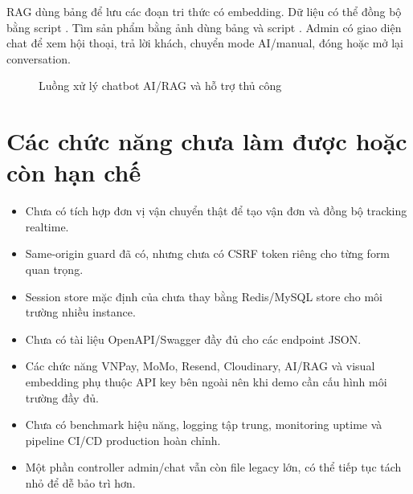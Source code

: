 \documentclass[12pt,a4paper]{report}
\begin{document}
RAG dùng bảng  để lưu các đoạn tri thức có embedding. Dữ liệu có thể đồng bộ bằng script . Tìm sản phẩm bằng ảnh dùng bảng  và script . Admin có giao diện chat để xem hội thoại, trả lời khách, chuyển mode AI/manual, đóng hoặc mở lại conversation.

\begin{figure}[H]
    \centering
    \caption{Luồng xử lý chatbot AI/RAG và hỗ trợ thủ công}
    \label{fig:chat-rag-flow}
\end{figure}

\section{Các chức năng chưa làm được hoặc còn hạn chế}

\begin{itemize}
    \item Chưa có tích hợp đơn vị vận chuyển thật để tạo vận đơn và đồng bộ tracking realtime.
    \item Same-origin guard đã có, nhưng chưa có CSRF token riêng cho từng form quan trọng.
    \item Session store mặc định của  chưa thay bằng Redis/MySQL store cho môi trường nhiều instance.
    \item Chưa có tài liệu OpenAPI/Swagger đầy đủ cho các endpoint JSON.
    \item Các chức năng VNPay, MoMo, Resend, Cloudinary, AI/RAG và visual embedding phụ thuộc API key bên ngoài nên khi demo cần cấu hình môi trường đầy đủ.
    \item Chưa có benchmark hiệu năng, logging tập trung, monitoring uptime và pipeline CI/CD production hoàn chỉnh.
    \item Một phần controller admin/chat vẫn còn file legacy lớn, có thể tiếp tục tách nhỏ để dễ bảo trì hơn.
\end{itemize}
\end{document}
